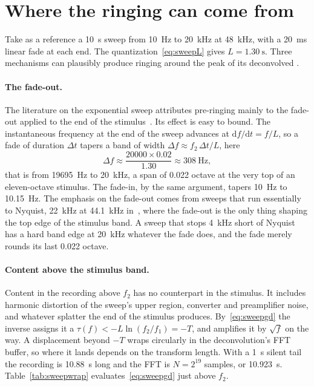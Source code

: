 \section{Where the ringing can come from}
Take as a reference a \SI{10}{\second} sweep from \SI{10}{\hertz} to \SI{20}{\kilo\hertz} at \SI{48}{\kilo\hertz}, with a \SI{20}{\milli\second} linear fade at each end. The quantization~\eqref{eq:sweepL} gives $L = \SI{1.30}{\second}$. Three mechanisms can plausibly produce ringing around the peak of its deconvolved .

\paragraph{The fade-out.} The literature on the exponential sweep attributes pre-ringing mainly to the fade-out applied to the end of the stimulus~\cite{Farina2007}. Its effect is easy to bound. The instantaneous frequency at the end of the sweep advances at $\mathrm{d}f/\mathrm{d}t = f/L$, so a fade of duration $\Delta t$ tapers a band of width $\Delta f \approx f_2\,\Delta t/L$, here
\begin{equation}
  \Delta f \approx \frac{20000 \times 0.02}{1.30} \approx \SI{308}{\hertz},
\end{equation}
that is from \SI{19695}{\hertz} to \SI{20}{\kilo\hertz}, a span of \num{0.022} octave at the very top of an eleven-octave stimulus. The fade-in, by the same argument, tapers \SI{10}{\hertz} to \SI{10.15}{\hertz}. The emphasis on the fade-out comes from sweeps that run essentially to Nyquist, \SI{22}{\kilo\hertz} at \SI{44.1}{\kilo\hertz} in~\cite{Farina2007}, where the fade-out is the only thing shaping the top edge of the stimulus band. A sweep that stops \SI{4}{\kilo\hertz} short of Nyquist has a hard band edge at \SI{20}{\kilo\hertz} whatever the fade does, and the fade merely rounds its last \num{0.022} octave.

\paragraph{Content above the stimulus band.} Content in the recording above $f_2$ has no counterpart in the stimulus. It includes harmonic distortion of the sweep's upper region, converter and preamplifier noise, and whatever splatter the end of the stimulus produces. By~\eqref{eq:sweepgd} the inverse assigns it a  $\tau(f) < -L\ln(f_2/f_1) = -T$, and amplifies it by $\sqrt{f}$ on the way. A displacement beyond $-T$ wraps circularly in the deconvolution's FFT buffer, so where it lands depends on the transform length. With a \SI{1}{\second} silent tail the recording is \SI{10.88}{\second} long and the FFT is $N = 2^{19}$ samples, or \SI{10.923}{\second}. Table~\ref{tab:sweepwrap} evaluates~\eqref{eq:sweepgd} just above $f_2$.

